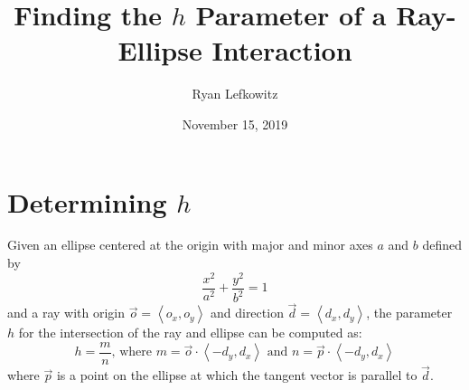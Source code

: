 \documentclass{article}
\title{Finding the $h$ Parameter of a Ray-Ellipse Interaction}
\author{Ryan Lefkowitz}
\date{November 15, 2019}
\newcommand{\rlvc}[1]{\left\langle#1\right\rangle}
\begin{document}
\maketitle

\section{Determining $h$}

\noindent Given an ellipse centered at the origin with major and minor axes $a$ and $b$ defined by
\begin{equation}
    \frac{x^2}{a^2} + \frac{y^2}{b^2} = 1
\end{equation}
and a ray with origin $\vec{o} = \rlvc{o_x, o_y}$ and direction $\vec{d} = \rlvc{d_x, d_y}$, the parameter $h$ for the intersection of the ray and ellipse can be computed as:
\begin{equation}
    h = \frac{m}{n}\text{, where }m = \vec{o}\cdot\rlvc{-d_y, d_x}\text{ and }n =\vec{p}\cdot\rlvc{-d_y, d_x}
\end{equation}
where $\vec{p}$ is a point on the ellipse at which the tangent vector is parallel to $\vec{d}$.
\end{document}
